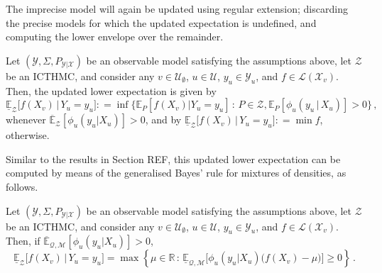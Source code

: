 \documentclass[twoside,11pt]{article}
\newcommand{\reals}{\mathbb{R}}
\newcommand{\states}{\mathcal{X}}
\newcommand{\observs}{\mathcal{Y}}
\newcommand{\lexp}{\underline{\mathbb{E}}_{\rateset,\mathcal{M}}}
\newcommand{\uexp}{\overline{\mathbb{E}}_{\rateset,\mathcal{M}}}
\newcommand{\gambles}{\mathcal{L}}
\newcommand{\rateset}{\mathcal{Q}}
\newcommand{\coloneqq}{:\!=}
\begin{document}
The imprecise model will again be updated using regular extension; discarding the precise models for which the updated expectation is undefined, and computing the lower envelope over the remainder.
\begin{definition}
Let $(\observs,\Sigma,P_{\observs\vert\states})$ be an observable model satisfying the assumptions above, let $\mathcal{Z}$ be an ICTHMC, and consider any $v\in\mathcal{U}_\emptyset$, $u\in\mathcal{U}$, $y_u\in\observs_u$, and $f\in\gambles(\states_v)$. Then, the updated lower expectation is given by 
\begin{equation*}
\underline{\mathbb{E}}_{\mathcal{Z}}\bigl[f(X_v)\,\vert\,Y_u = y_u\bigr] \coloneqq \inf\{\mathbb{E}_P[f(X_v)\vert Y_u=y_u]\,:\,P\in\mathcal{Z}, \mathbb{E}_P[\phi_u(y_u\,\vert\,X_u)]>0\}\,,
\end{equation*}
whenever $\overline{\mathbb{E}}_\mathcal{Z}[\phi_u(y_u\vert X_u)] >0$, and by $\underline{\mathbb{E}}_{\mathcal{Z}}\bigl[f(X_v)\,\vert\,Y_u=y_u\bigr]\coloneqq\min f$, otherwise.
\end{definition}

Similar to the results in Section REF, this updated lower expectation can be computed by means of the generalised Bayes' rule for mixtures of densities, as follows.

\begin{proposition}\label{prop:GBR_for_densities_lower_zero}
Let $(\observs,\Sigma,P_{\observs\vert\states})$ be an observable model satisfying the assumptions above, let $\mathcal{Z}$ be an ICTHMC, and consider any $v\in\mathcal{U}_\emptyset$, $u\in\mathcal{U}$, $y_u\in\observs_u$, and $f\in\gambles(\states_v)$. Then, if $\uexp[\phi_u(y_u\vert X_u)]>0$,
\begin{equation*}
\underline{\mathbb{E}}_{\mathcal{Z}}\bigl[f(X_v)\,\vert\,Y_u = y_u\bigr] = \max\left\{\mu\in\reals\,:\, \lexp\bigl[\phi_u(y_u\vert X_u)\bigl(f(X_v) - \mu\bigr)\bigr] \geq 0\right\}\,.
\end{equation*}
\end{proposition}
%
\end{document}
